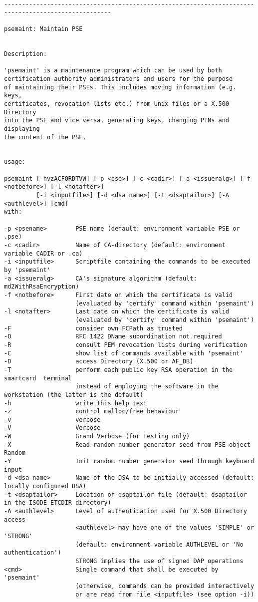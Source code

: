 {\begin{verbatim}
----------------------------------------------------------------------------------------------------

psemaint: Maintain PSE


Description:

'psemaint' is a maintenance program which can be used by both
certification authority administrators and users for the purpose
of maintaining their PSEs. This includes moving information (e.g. keys,
certificates, revocation lists etc.) from Unix files or a X.500 Directory
into the PSE and vice versa, generating keys, changing PINs and displaying
the content of the PSE.


usage:

psemaint [-hvzACFORDTVW] [-p <pse>] [-c <cadir>] [-a <issueralg>] [-f <notbefore>] [-l <notafter>]
         [-i <inputfile>] [-d <dsa name>] [-t <dsaptailor>] [-A <authlevel>] [cmd]
with:

-p <psename>        PSE name (default: environment variable PSE or .pse)
-c <cadir>          Name of CA-directory (default: environment variable CADIR or .ca)
-i <inputfile>      Scriptfile containing the commands to be executed by 'psemaint'
-a <issueralg>      CA's signature algorithm (default: md2WithRsaEncryption)
-f <notbefore>      First date on which the certificate is valid
                    (evaluated by 'certify' command within 'psemaint')
-l <notafter>       Last date on which the certificate is valid
                    (evaluated by 'certify' command within 'psemaint')
-F                  consider own FCPath as trusted
-O                  RFC 1422 DName subordination not required
-R                  consult PEM revocation lists during verification
-C                  show list of commands available with 'psemaint'
-D                  access Directory (X.500 or AF_DB)
-T                  perform each public key RSA operation in the smartcard  terminal
                    instead of employing the software in the workstation (the latter is the default)
-h                  write this help text
-z                  control malloc/free behaviour
-v                  verbose
-V                  Verbose
-W                  Grand Verbose (for testing only)
-X                  Read random number generator seed from PSE-object Random
-Y                  Init random number generator seed through keyboard input
-d <dsa name>       Name of the DSA to be initially accessed (default: locally configured DSA)
-t <dsaptailor>     Location of dsaptailor file (default: dsaptailor in the ISODE ETCDIR directory)
-A <authlevel>      Level of authentication used for X.500 Directory access
                    <authlevel> may have one of the values 'SIMPLE' or 'STRONG'
                    (default: environment variable AUTHLEVEL or 'No authentication')
                    STRONG implies the use of signed DAP operations
<cmd>               Single command that shall be executed by 'psemaint'
                    (otherwise, commands can be provided interactively
                    or are read from file <inputfile> (see option -i))


\end{verbatim}}
